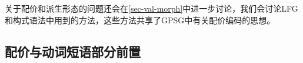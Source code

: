 关于配价和派生形态的问题还会在\ref{sec-val-morph}中进一步讨论，我们会讨论LFG\indexlfg 和构式语法\indexcxg 中用到的方法，这些方法共享了GPSG中有关配价编码的思想。

\subsection{配价与动词短语部分前置}

